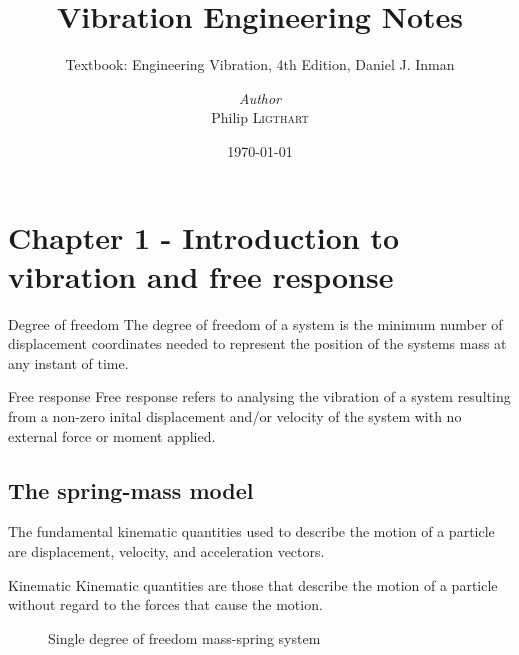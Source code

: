 \documentclass[a4paper, 12pt]{report}
\title{Vibration Engineering Notes}
\subtitle{Textbook: Engineering Vibration, 4th Edition, Daniel J. Inman}
\author{\textit{Author}\\Philip \textsc{Ligthart}}
\date{\today}
\begin{document}
    \maketitle
    \romantableofcontents

    \chapter{Chapter 1 - Introduction to vibration and free response}

      \begin{fmd-definition}{Degree of freedom}
        The degree of freedom of a system is the minimum number of displacement coordinates needed to represent the position of the systems mass at any instant of time.
      \end{fmd-definition}

      \begin{fmd-definition}{Free response}
        Free response refers to analysing the vibration of a system resulting from a non-zero inital displacement and/or velocity of the system with no external force or moment applied.
      \end{fmd-definition}
  
      \section{The spring-mass model}
        The fundamental kinematic quantities used to describe the motion of a particle are displacement, velocity, and acceleration vectors.

        \begin{fmd-definition}{Kinematic}
          Kinematic quantities are those that describe the motion of a particle without regard to the forces that cause the motion.
        \end{fmd-definition}
        
        \begin{figure}
          \centering
          \caption{Single degree of freedom mass-spring system}\label{fig:single-dof-mass-spring}
        \end{figure}
\end{document}
